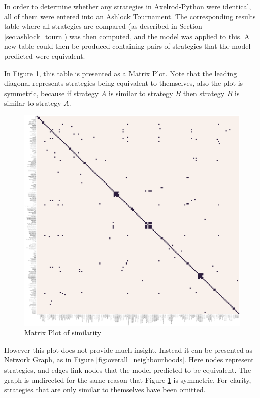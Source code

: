In order to determine whether any strategies in Axelrod-Python were identical, all of them were entered into an Ashlock Tournament.
The corresponding results table where all strategies are compared (as described in Section \ref{sec:ashlock_tourn}) was then computed, and the model was applied to this.
A new table could then be produced containing pairs of strategies that the model predicted were equivalent.

In Figure \ref{fig:matrix_similarity}, this table is presented as a Matrix Plot.
Note that the leading diagonal represents strategies being equivalent to themselves, also the plot is symmetric, because if strategy $A$ is similar to strategy $B$ then strategy $B$ is similar to strategy $A$.

\begin{figure}[htbp!]
    \centering
    \includegraphics[width=0.8\linewidth]{../img/ML/similarity_heatmap.png}
    \caption{Matrix Plot of similarity}
    \label{fig:matrix_similarity}
\end{figure}

However this plot does not provide much insight.
Instead it can be presented as Network Graph, as in Figure \ref{fig:overall_neighbourhoods}.
Here nodes represent strategies, and edges link nodes that the model predicted to be equivalent.
The graph is undirected for the same reason that Figure \ref{fig:matrix_similarity} is symmetric.
For clarity, strategies that are only similar to themselves have been omitted.

